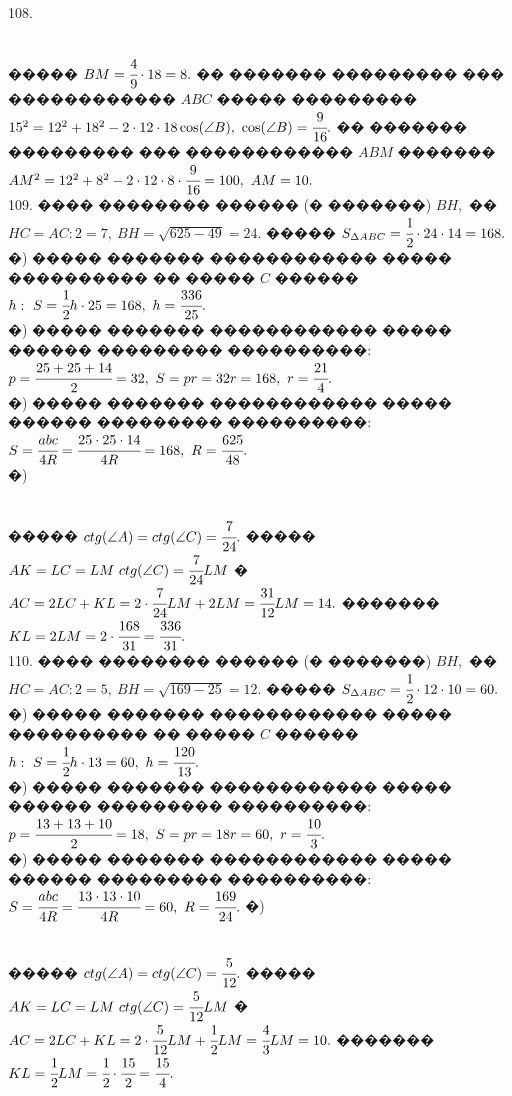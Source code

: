 \documentclass[12pt]{article}
\begin{document}
108. \begin{figure}[ht!]
\end{figure}\\
����� $BM=\cfrac{4}{9}\cdot18=8.$ �� ������� ��������� ��� ������������ $ABC$ ����� ��������� $15^2=12^2+18^2-2\cdot12\cdot18\cos(\angle B),\ \cos(\angle B)=\cfrac{9}{16}.$ �� ������� ��������� ��� ������������ $ABM$ ������� $AM^2=12^2+8^2-2\cdot12\cdot8\cdot\cfrac{9}{16}=100,\ AM=10.$\\
109. ���� �������� ������ (� �������) $BH,$ �� $HC=AC:2=7,\ BH=\sqrt{625-49}=24.$ ����� $S_{\Delta ABC}=\cfrac{1}{2}\cdot24\cdot14=168.$\\
�) ����� ������� ������������ ����� ���������� �� ����� $C$ ������ $h:\ S=\cfrac{1}{2}h\cdot25=168,\ h=\cfrac{336}{25}.$\\
�) ����� ������� ������������ ����� ������ ��������� ����������: $p=\cfrac{25+25+14}{2}=32,\ S=pr=32r=168,\ r=\cfrac{21}{4}.$\\
�) ����� ������� ������������ ����� ������ ��������� ����������: $S=\cfrac{abc}{4R}=\cfrac{25\cdot25\cdot14}{4R}=168,\ R=\cfrac{625}{48}.$\\
�) \begin{figure}[ht!]
\end{figure}\\
����� $ctg(\angle A)=ctg(\angle C)=\cfrac{7}{24}.$ ����� $AK=LC=LM\ ctg(\angle C)=\cfrac{7}{24}LM$ � $AC=2LC+KL=2\cdot\cfrac{7}{24}LM+2LM=\cfrac{31}{12}LM=14.$ ������� $KL=2LM=2\cdot\cfrac{168}{31}=\cfrac{336}{31}.$\\
110. ���� �������� ������ (� �������) $BH,$ �� $HC=AC:2=5,\ BH=\sqrt{169-25}=12.$ ����� $S_{\Delta ABC}=\cfrac{1}{2}\cdot12\cdot10=60.$\\
�) ����� ������� ������������ ����� ���������� �� ����� $C$ ������ $h:\ S=\cfrac{1}{2}h\cdot13=60,\ h=\cfrac{120}{13}.$\\
�) ����� ������� ������������ ����� ������ ��������� ����������: $p=\cfrac{13+13+10}{2}=18,\ S=pr=18r=60,\ r=\cfrac{10}{3}.$\\
�) ����� ������� ������������ ����� ������ ��������� ����������: $S=\cfrac{abc}{4R}=\cfrac{13\cdot13\cdot10}{4R}=60,\ R=\cfrac{169}{24}.$\newpage\noindent
�) \begin{figure}[ht!]
\end{figure}\\
����� $ctg(\angle A)=ctg(\angle C)=\cfrac{5}{12}.$ ����� $AK=LC=LM\ ctg(\angle C)=\cfrac{5}{12}LM$ � $AC=2LC+KL=2\cdot\cfrac{5}{12}LM+\cfrac{1}{2}LM=\cfrac{4}{3}LM=10.$ ������� $KL=\cfrac{1}{2}LM=\cfrac{1}{2}\cdot\cfrac{15}{2}=\cfrac{15}{4}.$\\
\end{document}
